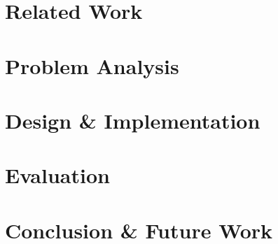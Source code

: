 \documentclass[12pt,a4paper,twoside]{report}
\theoremstyle{definition}
\begin{document}
\chapter{Related Work}
\label{ch:related_work}  	
	
\cleardoublepage    

\chapter{Problem Analysis}
\label{ch:problem_analysis}   
  		
  		
\chapter{Design \& Implementation}
\label{ch:design_implementaion}  
	
\cleardoublepage    

\chapter{Evaluation}
\label{ch:evaluation}  
	
\cleardoublepage  

\chapter{Conclusion \& Future Work}
\label{ch:conclusion_future_work}  
	
\cleardoublepage  

    
\nocite{*}


		
\cleardoublepage



\begin{appendices}
	
	\cleardoublepage
\end{appendices}

\listoftables
\cleardoublepage
\listoffigures
\cleardoublepage
\printindex
\cleardoublepage
\printnomenclature
\renewcommand{\leftmark}{\uppercase{Abbreviations}}
\cleardoublepage
\end{document}
